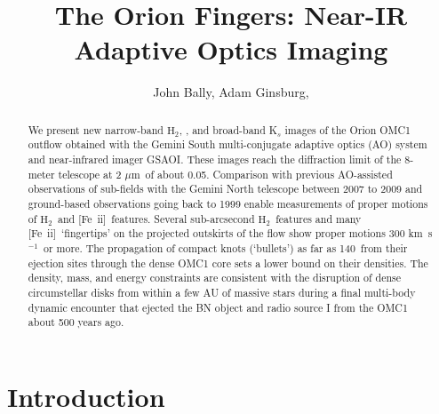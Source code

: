 \documentclass[12pt,preprint]{aastex}
\newcommand{\kms}{km~s{$^{-1}$}}
\newcommand{\Feii}{[Fe~{\sc ii}]}
\newcommand{\mum}{\ensuremath{\mu \mathrm{m}}}
\newcommand{\hh}{\ensuremath{\textrm{H}_{2}}}			%
\newcommand{\feii}{\ion{Fe}{2}}		%
\begin{document}
\title{The Orion Fingers:   Near-IR Adaptive Optics Imaging}

\author{
               John Bally,               
               Adam Ginsburg,
	    }
	    



\begin{abstract}
    We present new narrow-band \hh ,   \feii, and broad-band K$_s$ images of the 
    Orion  OMC1 outflow  obtained with the Gemini South multi-conjugate 
    adaptive optics (AO) system and near-infrared imager GSAOI.   These  images 
    reach the diffraction limit of the 8-meter telescope at 2 \mum\ of about 0.05\arcsec  .
    Comparison with previous AO-assisted observations of sub-fields with the Gemini
    North telescope between 2007 to 2009 and ground-based observations going back
    to 1999 enable measurements of proper motions of \hh\ and \Feii\ features.   
    Several sub-arcsecond \hh\ features and many \Feii\
    `fingertips' on the projected outskirts of the flow show proper motions 300 \kms\ or more.  
    The propagation of compact  knots (`bullets') as far as 140\arcsec\ from their ejection 
    sites through the dense OMC1 core sets a lower bound on their densities.  The 
    density, mass, and energy constraints are  consistent with the  disruption  of dense 
    circumstellar disks from within a few AU of massive stars during a final multi-body
    dynamic encounter that ejected  the BN object and radio source I from the OMC1 
    about 500 years ago.  
 \end{abstract}



\section{Introduction} 
\end{document}
